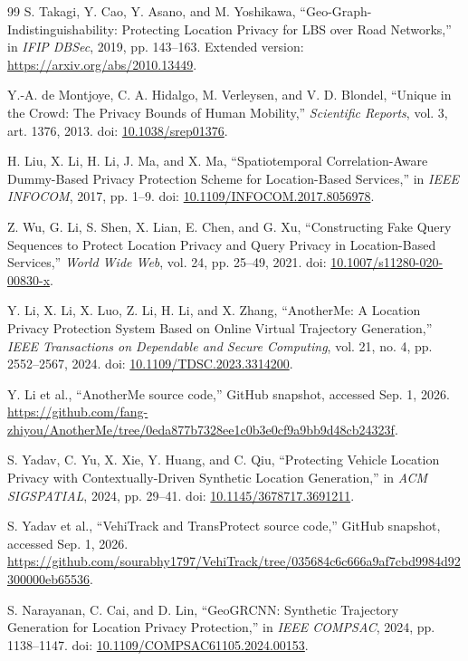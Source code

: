 \documentclass[12pt,a4paper,oneside]{report}
\begin{document}
\begin{thebibliography}{99}
S. Takagi, Y. Cao, Y. Asano, and M. Yoshikawa,
``Geo-Graph-Indistinguishability: Protecting Location Privacy for LBS over Road Networks,''
in \emph{IFIP DBSec}, 2019, pp. 143--163.
Extended version: \url{https://arxiv.org/abs/2010.13449}.

Y.-A. de Montjoye, C. A. Hidalgo, M. Verleysen, and V. D. Blondel,
``Unique in the Crowd: The Privacy Bounds of Human Mobility,''
\emph{Scientific Reports}, vol. 3, art. 1376, 2013.
doi: \href{https://doi.org/10.1038/srep01376}{10.1038/srep01376}.

H. Liu, X. Li, H. Li, J. Ma, and X. Ma,
``Spatiotemporal Correlation-Aware Dummy-Based Privacy Protection Scheme for Location-Based Services,''
in \emph{IEEE INFOCOM}, 2017, pp. 1--9.
doi: \href{https://doi.org/10.1109/INFOCOM.2017.8056978}{10.1109/INFOCOM.2017.8056978}.

Z. Wu, G. Li, S. Shen, X. Lian, E. Chen, and G. Xu,
``Constructing Fake Query Sequences to Protect Location Privacy and Query Privacy in Location-Based Services,''
\emph{World Wide Web}, vol. 24, pp. 25--49, 2021.
doi: \href{https://doi.org/10.1007/s11280-020-00830-x}{10.1007/s11280-020-00830-x}.

Y. Li, X. Li, X. Luo, Z. Li, H. Li, and X. Zhang,
``AnotherMe: A Location Privacy Protection System Based on Online Virtual Trajectory Generation,''
\emph{IEEE Transactions on Dependable and Secure Computing}, vol. 21, no. 4,
pp. 2552--2567, 2024.
doi: \href{https://doi.org/10.1109/TDSC.2023.3314200}{10.1109/TDSC.2023.3314200}.

Y. Li et al., ``AnotherMe source code,'' GitHub snapshot, accessed Sep. 1, 2026.
\url{https://github.com/fang-zhiyou/AnotherMe/tree/0eda877b7328ee1c0b3e0cf9a9bb9d48cb24323f}.

S. Yadav, C. Yu, X. Xie, Y. Huang, and C. Qiu,
``Protecting Vehicle Location Privacy with Contextually-Driven Synthetic Location Generation,''
in \emph{ACM SIGSPATIAL}, 2024, pp. 29--41.
doi: \href{https://doi.org/10.1145/3678717.3691211}{10.1145/3678717.3691211}.

S. Yadav et al., ``VehiTrack and TransProtect source code,'' GitHub snapshot, accessed Sep. 1, 2026.
\url{https://github.com/sourabhy1797/VehiTrack/tree/035684c6c666a9af7cbd9984d92300000eb65536}.

S. Narayanan, C. Cai, and D. Lin,
``GeoGRCNN: Synthetic Trajectory Generation for Location Privacy Protection,''
in \emph{IEEE COMPSAC}, 2024, pp. 1138--1147.
doi: \href{https://doi.org/10.1109/COMPSAC61105.2024.00153}{10.1109/COMPSAC61105.2024.00153}.


\end{thebibliography}
\end{document}
